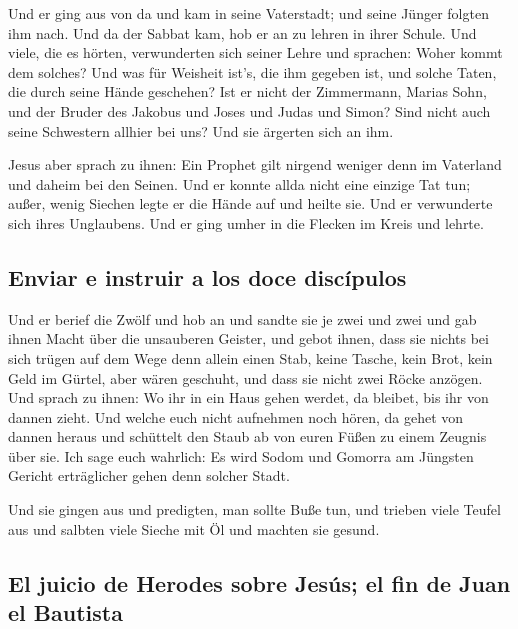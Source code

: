  Und er ging aus von da und kam in seine Vaterstadt; und
seine Jünger folgten ihm nach.  Und da der Sabbat kam, hob
er an zu lehren in ihrer Schule. Und viele, die es hörten, verwunderten
sich seiner Lehre und sprachen: Woher kommt dem solches? Und was für
Weisheit ist's, die ihm gegeben ist, und solche Taten, die durch seine
Hände geschehen?  Ist er nicht der Zimmermann, Marias
Sohn, und der Bruder des Jakobus und Joses und Judas und Simon? Sind
nicht auch seine Schwestern allhier bei uns? Und sie ärgerten sich an
ihm.

 Jesus aber sprach zu ihnen: Ein Prophet gilt nirgend
weniger denn im Vaterland und daheim bei den Seinen.  Und
er konnte allda nicht eine einzige Tat tun; außer, wenig Siechen legte
er die Hände auf und heilte sie.  Und er verwunderte sich
ihres Unglaubens. Und er ging umher in die Flecken im Kreis und lehrte.

\hypertarget{enviar-e-instruir-a-los-doce-discuxedpulos}{%
\subsection{Enviar e instruir a los doce
discípulos}\label{enviar-e-instruir-a-los-doce-discuxedpulos}}

 Und er berief die Zwölf und hob an und sandte sie je zwei
und zwei und gab ihnen Macht über die unsauberen Geister, 
und gebot ihnen, dass sie nichts bei sich trügen auf dem Wege denn
allein einen Stab, keine Tasche, kein Brot, kein Geld im Gürtel,
 aber wären geschuht, und dass sie nicht zwei Röcke
anzögen.  Und sprach zu ihnen: Wo ihr in ein Haus gehen
werdet, da bleibet, bis ihr von dannen zieht.  Und welche
euch nicht aufnehmen noch hören, da gehet von dannen heraus und
schüttelt den Staub ab von euren Füßen zu einem Zeugnis über sie. Ich
sage euch wahrlich: Es wird Sodom und Gomorra am Jüngsten Gericht
erträglicher gehen denn solcher Stadt.

 Und sie gingen aus und predigten, man sollte Buße tun,
 und trieben viele Teufel aus und salbten viele Sieche
mit Öl und machten sie gesund.

\hypertarget{el-juicio-de-herodes-sobre-jesuxfas-el-fin-de-juan-el-bautista}{%
\subsection{El juicio de Herodes sobre Jesús; el fin de Juan el
Bautista}\label{el-juicio-de-herodes-sobre-jesuxfas-el-fin-de-juan-el-bautista}}

